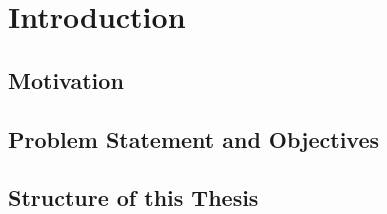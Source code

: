 \chapter{Introduction}
\label{ch:introduction}

\section{Motivation}
\label{sec:motivation}


\section{Problem Statement and Objectives}
\label{sec:problem-statement}


\section{Structure of this Thesis}
\label{sec:structure}


